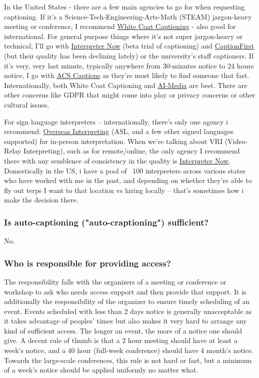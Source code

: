\documentclass{article}
\begin{document}
  In the United States - there are a few main agencies to go for when requesting captioning. If it's a Science-Tech-Engineering-Arts-Math (STEAM) jargon-heavy meeting or conference, I recommend \href{https://whitecoatcaptioning.com/}{White Coat Captioning} - also good for international. For general purpose things where it's not super jargon-heavy or technical, I'll go with \href{https://www.interpreter-now.com/}{Interpreter Now} (beta trial of captioning) and \href{https://captionfirst.com/}{CaptionFirst} (but their quality has been declining lately) or the university's staff captioners. If it's very, very last minute, typically anywhere from 30-minutes notice to 24 hours notice, I go with \href{https://www.acscaptions.com/}{ACS Captions} as they're most likely to find someone that fast. Internationally, both White Coat Captioning and \href{https://www.ai-media.tv/}{AI-Media} are best. There are other concerns like GDPR that might come into play or privacy concerns or other cultural issues.

  For sign language interpreters -- internationally, there's only one agency i recommend: \href{http://www.overseasinterpreting.com/}{Overseas Interpreting} (ASL, and a few other signed languages supported) for in-person interpretation. When we're talking about VRI (Video-Relay Interpreting), such as for remote/online, the only agency I recommend there with any semblence of consistency in the quality is \href{https://www.interpreter-now.com/}{Interpreter Now}. Domestically in the US, i have a pool of ~100 interpreters across various states who have worked with me in the past, and depending on whether they're able to fly out terps I want to that location vs hiring locally -- that's sometimes how i make the decision there.

  \subsubsection{Is auto-captioning ("auto-craptioning") sufficient?}

  No.~\cite{AudioAccessibility, TheAtlantic, DCMP, ReelWords, A11yNYC, Wired, AngryDeafPeople}

  \subsubsection{Who is responsible for providing access?}

  The responsibility falls with the organizers of a meeting or conference or workshop to ask who needs access support and then provide that support. It is additionally the responsibility of the organizer to ensure timely scheduling of an event. Events scheduled with less than 2 days notice is generally unacceptable as it takes advantage of peoples' times but also makes it very hard to arrange any kind of sufficient access. The longer an event, the more of a notice one should give. A decent rule of thumb is that a 2 hour meeting should have at least a week's notice, and a 40 hour (full-week conference) should have 4 month's notice. Towards the large-scale conferences, this rule is not hard or fast, but a minimum of a week's notice should be applied uniformly no matter what.
\end{document}
